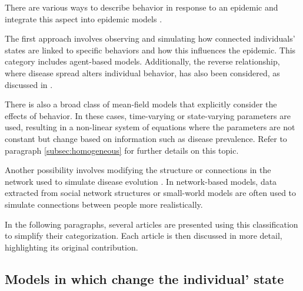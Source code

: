 There are various ways to describe behavior in response to an epidemic and integrate this aspect into epidemic models \cite{Wang_2019, Bedson2021, Wang_2015_review}.

The first approach involves observing and simulating how connected individuals' states are linked to specific behaviors and how this influences the epidemic. This category includes agent-based models. Additionally, the reverse relationship, where disease spread alters individual behavior, has also been considered, as discussed in \cite{Granell_2014}.

There is also a broad class of mean-field models that explicitly consider the effects of behavior. In these cases, time-varying or state-varying parameters are used, resulting in a non-linear system of equations where the parameters are not constant but change based on information such as disease prevalence. Refer to paragraph \ref{subsec:homogeneous} for further details on this topic.

Another possibility involves modifying the structure or connections in the network used to simulate disease evolution \cite{Peng2021}. In network-based models, data extracted from social network structures \cite{Carballosa_2021} or small-world models \cite{Turker_2023} are often used to simulate connections between people more realistically.

In the following paragraphs, several articles are presented using this classification to simplify their categorization. Each article is then discussed in more detail, highlighting its original contribution.

\subsection{Models in which change the individual' state}
\label{subsec:individual_state}
